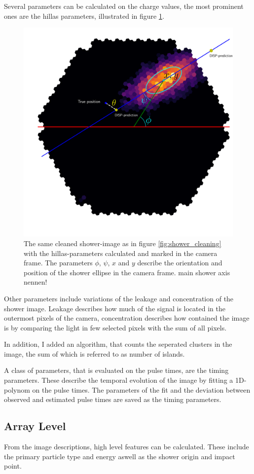 Several parameters can be calculated on the charge values, the most prominent ones are the 
hillas parameters, illustrated in figure \ref{fig:hillas_params}.

\begin{figure}
	\centering	
	\captionsetup{width=0.9\linewidth}
	\includegraphics[width=.6\textwidth]{Plots/hillas_complete.pdf}
	\caption{The same cleaned shower-image as in figure \ref{fig:shower_cleaning}
	with the hillas-parameters calculated and marked in the camera frame.
	The parameters $\phi$, $\psi$, $x$ and $y$ describe the 
	orientation and position of the shower ellipse in the camera frame.
  main shower axis nennen!}
	\label{fig:hillas_params}
\end{figure}

Other parameters include variations of the leakage and concentration of the shower image.
Leakage describes how much of the signal is located in the outermost pixels of the camera, 
concentration describes how contained the image is by comparing the light in 
few selected pixels with the sum of all pixels.

In addition, I added an algorithm, that counts the seperated clusters in the image,
the sum of which is referred to as number of islands.

A class of parameters, that is evaluated on the pulse times, are the timing
parameters. These describe the temporal evolution of the image by fitting
a 1D-polynom on the pulse times. The parameters of the fit and the deviation
between observed and estimated pulse times are saved as the timing parameters. 


\subsection{Array Level}
From the image descriptions, high level features can be calculated.
These include the primary particle type and energy aswell as 
the shower origin and impact point.

